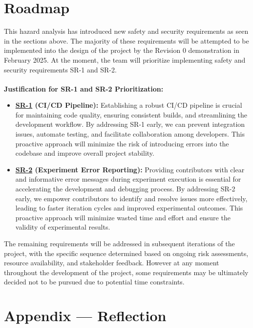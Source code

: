 \documentclass{article}
\begin{document}
\section{Roadmap}

This hazard analysis has introduced new safety and security requirements as seen in the sections above. The majority of these requirements will be attempted to be implemented into the design of the project by the Revision 0 demonstration in February 2025. At the moment, the team will prioritize implementing safety and security requirements SR-1 and SR-2.
\\\\
\textbf{Justification for SR-1 and SR-2 Prioritization:}
\begin{itemize}
    \item \textbf{\hyperref[SR-1]{SR-1} (CI/CD Pipeline):} Establishing a robust CI/CD pipeline is crucial for maintaining code quality, ensuring consistent builds, and streamlining the development workflow. By addressing SR-1 early, we can prevent integration issues, automate testing, and facilitate collaboration among developers. This proactive approach will minimize the risk of introducing errors into the codebase and improve overall project stability.
    \item \textbf{\hyperref[SR-2]{SR-2} (Experiment Error Reporting):} Providing contributors with clear and informative error messages during experiment execution is essential for accelerating the development and debugging process. By addressing SR-2 early, we empower contributors to identify and resolve issues more effectively, leading to faster iteration cycles and improved experimental outcomes. This proactive approach will minimize wasted time and effort and ensure the validity of experimental results.
\end{itemize}
The remaining requirements will be addressed in subsequent iterations of the project, with the specific sequence determined based on ongoing risk assessments, resource availability, and stakeholder feedback. However at any moment throughout the development of the project, some requirements may be ultimately decided not to be pursued due to potential time constraints.

\newpage{}

\section*{Appendix --- Reflection}


\end{document}
